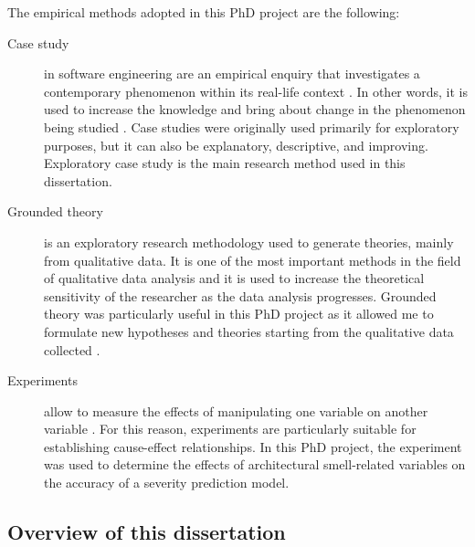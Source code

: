 The empirical methods adopted in this PhD project are the following:
\begin{description}
    \item[Case study] in software engineering are an empirical enquiry that investigates a contemporary phenomenon within its real-life context \cite{Yin2003}. In other words, it is used to increase the knowledge and bring about change in the phenomenon being studied \cite{Runeson2012}. Case studies were originally used primarily for exploratory purposes, but it can also be explanatory, descriptive, and improving.
    Exploratory case study is the main research method used in this dissertation.
    
    \item[Grounded theory] is an exploratory research methodology used to generate theories, mainly from qualitative data. It is one of the most important methods in the field of qualitative data analysis and it is used to increase the theoretical sensitivity of the researcher as the data analysis progresses. Grounded theory was particularly useful in this PhD project as it allowed me to formulate new hypotheses and theories starting from the qualitative data collected \cite{Glaser1968}.
    
    \item[Experiments] allow to measure the effects of manipulating one variable on another variable \cite{Runeson2012}. For this reason, experiments are particularly suitable for establishing cause-effect relationships.
    In this PhD project, the experiment was used to determine the effects of architectural smell-related variables on the accuracy of a severity prediction model.
    
\end{description}

\subsection{Overview of this dissertation}
